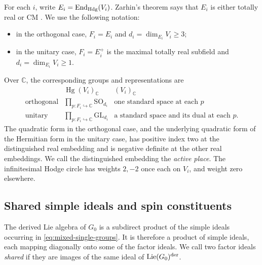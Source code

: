 \documentclass[11pt]{article}
\numberwithin{equation}{section}
\theoremstyle{definition}
\theoremstyle{remark}
\newcommand{\C}{\mathbb C}
\DeclareMathOperator{\End}{End}
\DeclareMathOperator{\Hg}{Hg}
\begin{document}
For each $i$, write $E_i=\End_{\rm Hdg}(V_i)$.  Zarhin's theorem says
that $E_i$ is either totally real or CM \cite{Zarhin}.  We use the
following notation:
\begin{itemize}
\item in the orthogonal case, $F_i=E_i$ and
  $d_i=\dim_{E_i}V_i\ge3$;
\item in the unitary case, $F_i=E_i^+$ is the maximal totally real
  subfield and $d_i=\dim_{E_i}V_i\ge1$.
\end{itemize}
Over $\C$, the corresponding groups and representations are
\begin{equation}\label{eq:mixed-single-groups}
 \begin{array}{c|c|c}
 &\Hg(V_i)_{\C}&(V_i)_{\C}\\ \hline
 \text{orthogonal}&\displaystyle\prod_{p:F_i\hookrightarrow\C}
       \mathrm{SO}_{d_i}
   &\text{one standard space at each }p\\[3pt]
 \text{unitary}&\displaystyle\prod_{p:F_i\hookrightarrow\C}
       \mathrm{GL}_{d_i}
   &\text{a standard space and its dual at each }p .
 \end{array}
\end{equation}
The quadratic form in the orthogonal case, and the underlying quadratic
form of the Hermitian form in the unitary case, has positive index two
at the distinguished real embedding and is negative definite at the
other real embeddings.  We call the distinguished embedding the
\emph{active place}.  The infinitesimal Hodge circle has weights
$2,-2$ once each on $V_i$, and weight zero elsewhere.

\subsection{Shared simple ideals and spin constituents}

The derived Lie algebra of $G_0$ is a subdirect product of the simple
ideals occurring in \eqref{eq:mixed-single-groups}.  It is therefore
a product of simple ideals, each mapping diagonally onto some of the
factor ideals.  We call two factor ideals \emph{shared} if they are
images of the same ideal of $\operatorname{Lie}(G_0)^{\rm der}$.
\end{document}
